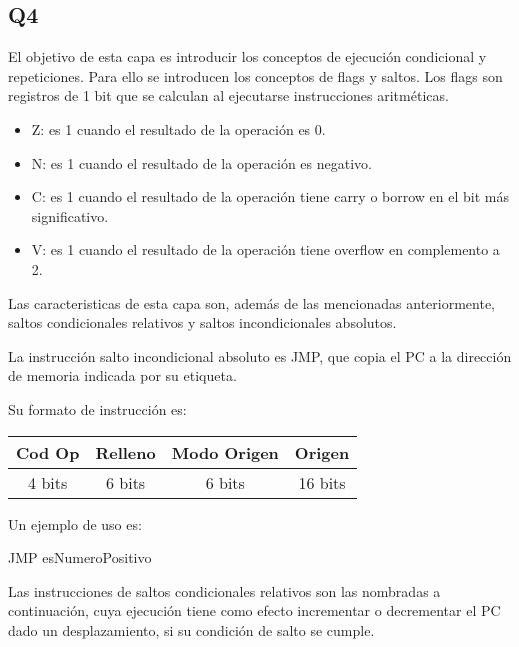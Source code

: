 \begin{threeparttable}
\begin{threeparttable}
\section{Q4}
El objetivo de esta capa es introducir los conceptos de ejecución condicional y repeticiones. Para ello se introducen los conceptos de flags y saltos.
Los flags son registros de 1 bit que se calculan al ejecutarse instrucciones aritméticas. 
\begin{itemize}
  \item Z: es 1 cuando el resultado de la operación es 0.
  \item N: es 1 cuando el resultado de la operación es negativo.
  \item C: es 1 cuando el resultado de la operación tiene carry o borrow en el bit más significativo.
  \item V: es 1 cuando el resultado de la operación tiene overflow en complemento a 2.
\end{itemize}

Las caracteristicas de esta capa son, además de las mencionadas anteriormente, saltos condicionales relativos y saltos incondicionales absolutos.

La instrucción salto incondicional absoluto es JMP, que copia el PC a la dirección de memoria indicada por su etiqueta.

Su formato de instrucción es:
\begin{table}[H]
  \label{tab:formatoinstruccion}
  \begin{center}
    \begin{tabular}{| c | c | c | c |}
      \hline
      \textbf{Cod Op} & \textbf{Relleno} & \textbf{Modo Origen} & \textbf{Origen} \\ \hline
      4 bits          & 6 bits                & 6 bits          & 16 bits         \\ \hline
    \end{tabular}
  \end{center}
\end{table}

Un ejemplo de uso es:
\begin{center}
  JMP esNumeroPositivo
\end{center}

Las instrucciones de saltos condicionales relativos son las nombradas a continuación, cuya ejecución tiene como efecto incrementar o decrementar el PC dado un desplazamiento, si su condición de salto se cumple.


\end{threeparttable}
\end{threeparttable}
